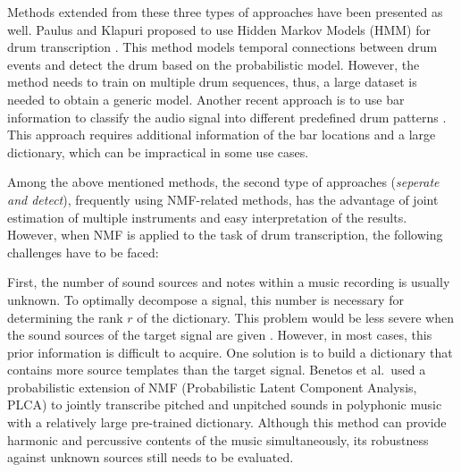 \documentclass{article}
\begin{document}
Methods extended from these three types of approaches have been presented as well. Paulus and Klapuri proposed to use Hidden Markov Models (HMM) for drum transcription \cite{Paulus2009a}. This method models temporal connections between drum events and detect the drum based on the probabilistic model. However, the method needs to train on multiple drum sequences, thus, a large dataset is needed to obtain a generic model. Another recent approach is to use bar information to classify the audio signal into different predefined drum patterns \cite{Thompson2014}. This approach requires additional information of the bar locations and a large dictionary, which can be impractical in some use cases.

Among the above mentioned methods, the second type of approaches (\textit{seperate and detect}), frequently using NMF-related methods, has the advantage of joint estimation of multiple instruments and easy interpretation of the results. However, when NMF is applied to the task of drum transcription, the following challenges have to be faced:

First, the number of sound sources and notes within a music recording is usually unknown. To optimally decompose a signal, this number is necessary for determining the rank $r$ of the dictionary. This problem would be less severe when the sound sources of the target signal are given \cite{Lindsay-Smith2012}. However, in most cases, this prior information is difficult to acquire. One solution is to build a dictionary that contains more source templates than the target signal. Benetos et al.\ used a probabilistic extension of NMF (Probabilistic Latent Component Analysis, PLCA) to jointly transcribe pitched and unpitched sounds in polyphonic music with a relatively large pre-trained dictionary\cite{Benetos2014}. Although this method can provide harmonic and percussive contents of the music simultaneously, its robustness against unknown sources still needs to be evaluated. %
\end{document}

